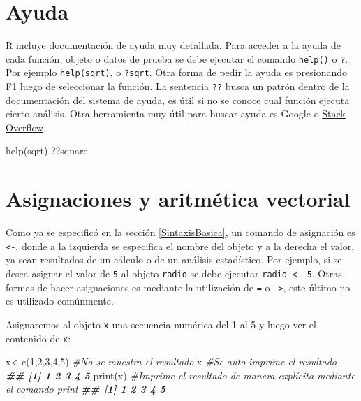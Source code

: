 \documentclass[
]{book}
\newenvironment{Shaded}{\begin{snugshade}}{\end{snugshade}}
\newcommand{\CommentTok}[1]{\textcolor[rgb]{0.56,0.35,0.01}{\textit{#1}}}
\newcommand{\DecValTok}[1]{\textcolor[rgb]{0.00,0.00,0.81}{#1}}
\newcommand{\DocumentationTok}[1]{\textcolor[rgb]{0.56,0.35,0.01}{\textbf{\textit{#1}}}}
\newcommand{\FunctionTok}[1]{\textcolor[rgb]{0.00,0.00,0.00}{#1}}
\newcommand{\NormalTok}[1]{#1}
\newcommand{\OtherTok}[1]{\textcolor[rgb]{0.56,0.35,0.01}{#1}}
\begin{document}
\hypertarget{ayuda}{%
\section{Ayuda}\label{ayuda}}

R incluye documentación de ayuda muy detallada. Para acceder a la ayuda de cada función, objeto o datos de prueba se debe ejecutar el comando \texttt{help()} o \texttt{?}. Por ejemplo \texttt{help(sqrt)}, o \texttt{?sqrt}. Otra forma de pedir la ayuda es presionando F1 luego de seleccionar la función. La sentencia \texttt{??} busca un patrón dentro de la documentación del sistema de ayuda, es útil si no se conoce cual función ejecuta cierto análisis. Otra herramienta muy útil para buscar ayuda es Google o \href{https://stackoverflow.com/}{Stack Overflow}.

\begin{Shaded}
\begin{Highlighting}[]
\FunctionTok{help}\NormalTok{(sqrt)}
\NormalTok{??square}
\end{Highlighting}
\end{Shaded}

\hypertarget{asignaciones-y-aritmuxe9tica-vectorial}{%
\section{Asignaciones y aritmética vectorial}\label{asignaciones-y-aritmuxe9tica-vectorial}}

Como ya se especificó en la sección \ref{SintaxisBasica}, un comando de asignación es \texttt{\textless{}-}, donde a la izquierda se especifica el nombre del objeto y a la derecha el valor, ya sean resultados de un cálculo o de un análisis estadístico. Por ejemplo, si se desea asignar el valor de \texttt{5} al objeto \texttt{radio} se debe ejecutar \texttt{radio\ \textless{}-\ 5}. Otras formas de hacer asignaciones es mediante la utilización de \texttt{=} o \texttt{-\textgreater{}}, este último no es utilizado comúnmente.

Asignaremos al objeto \texttt{x} una secuencia numérica del 1 al 5 y luego ver el contenido de \texttt{x}:

\begin{Shaded}
\begin{Highlighting}[]
\NormalTok{x}\OtherTok{\textless{}{-}}\FunctionTok{c}\NormalTok{(}\DecValTok{1}\NormalTok{,}\DecValTok{2}\NormalTok{,}\DecValTok{3}\NormalTok{,}\DecValTok{4}\NormalTok{,}\DecValTok{5}\NormalTok{)  }\CommentTok{\#No se muestra el resultado}
\NormalTok{x                }\CommentTok{\#Se auto imprime el resultado}
\DocumentationTok{\#\# [1] 1 2 3 4 5}
\FunctionTok{print}\NormalTok{(x)         }\CommentTok{\#Imprime el resultado de manera explícita mediante el comando print }
\DocumentationTok{\#\# [1] 1 2 3 4 5}
\end{Highlighting}
\end{Shaded}
\end{document}
